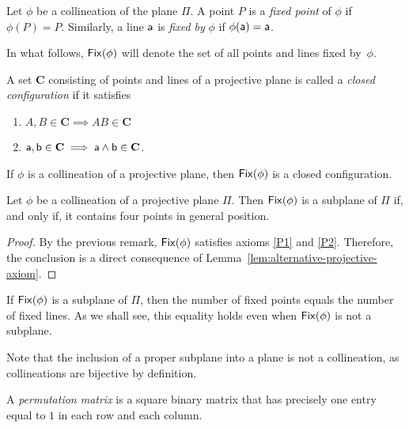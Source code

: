 \begin{defns}
    Let $\phi$ be a collineation of the plane $\Pi$. A point $P$ is a \textsl{fixed point} of $\phi$ if $\phi(P)=P$. Similarly, a line $\mathsf a$ is \textsl{fixed by} $\phi$ if $\phi(\mathsf a)=\mathsf a$.

    In what follows, $\operatorname{\mathsf{Fix}}(\phi)$ will denote the set of all points and lines fixed by~$\phi$.

    A set $\mathbf C$ consisting of points and lines of a projective plane is called a \textsl{closed configuration} if it satisfies
    \begin{enumerate}[label=C\arabic*.]
        \item $A,B\in\mathbf C\implies AB\in\mathbf C$
        \item $\mathsf a,\mathsf b\in\mathbf C\implies \mathsf a\wedge\mathsf b\in\mathbf C$.
    \end{enumerate}
\end{defns}

\begin{rem}
    If\/ $\phi$ is a collineation of a projective plane, then\/ $\operatorname{\mathsf{Fix}}(\phi)$ is a closed configuration.
\end{rem}

\begin{prop}\label{prop:Fix-subplane-4-points-condition}
    Let\/ $\phi$ be a collineation of a projective plane\/ $\Pi$. Then\/ $\operatorname{\mathsf{Fix}}(\phi)$ is a subplane of\/ $\Pi$ if, and only if, it contains four points in general position.
\end{prop}

\begin{proof}
    By the previous remark, $\operatorname{\mathsf{Fix}}(\phi)$ satisfies axioms \ref{P1} and \ref{P2}. Therefore, the conclusion is a direct consequence of Lemma~\ref{lem:alternative-projective-axiom}.
\end{proof}

\begin{rem}
    If\/ $\operatorname{\mathsf{Fix}}(\phi)$ is a subplane of\/ $\Pi$, then the number of fixed points equals the number of fixed lines. As we shall see, this equality holds even when\/ $\operatorname{\mathsf{Fix}}(\phi)$ is not a subplane.
\end{rem}

\begin{rem}
    Note that the inclusion of a proper subplane into a plane is not a collineation, as collineations are bijective by definition.
\end{rem}

\begin{defn}
    A \textsl{permutation matrix} is a square binary matrix that has precisely one entry equal to $1$ in each row and each column.
\end{defn}

